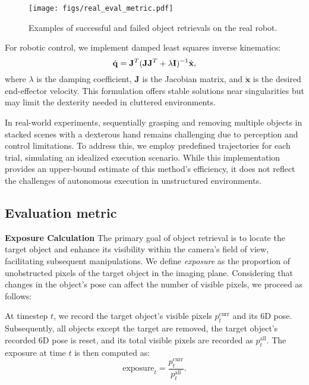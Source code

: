 \begin{figure*}[!t]
    \centering
    \texttt{[image: figs/real\_eval\_metric.pdf]}
    \caption{{Examples of successful and failed object retrievals on the real robot.}}
    \label{fig:real_eval_metric}
\end{figure*}

For robotic control, we implement damped least squares inverse kinematics: 
\begin{equation} 
    \dot{\mathbf{q}} = \mathbf{J}^T(\mathbf{J}\mathbf{J}^T + \lambda \mathbf{I})^{-1}\dot{\mathbf{x}}, \notag 
\end{equation} 
where $\lambda$ is the damping coefficient, $\mathbf{J}$ is the Jacobian matrix, and $\dot{\mathbf{x}}$ is the desired end-effector velocity. This formulation offers stable solutions near singularities but may limit the dexterity needed in cluttered environments.


In real-world experiments, sequentially grasping and removing multiple objects in stacked scenes with a dexterous hand remains challenging due to perception and control limitations. To address this, we employ predefined trajectories for each trial, simulating an idealized execution scenario. While this implementation provides an upper-bound estimate of this method’s efficiency, it does not reflect the challenges of autonomous execution in unstructured environments.

\subsection{Evaluation metric}\label{appendix:eval_metric}
\noindent \textbf{Exposure Calculation}
The primary goal of object retrieval is to locate the target object and enhance its visibility within the camera’s field of view, facilitating subsequent manipulations. We define \textit{exposure} as the proportion of unobstructed pixels of the target object in the imaging plane. Considering that changes in the object's pose can affect the number of visible pixels, we proceed as follows:

At timestep $t$, we record the target object's visible pixels $p_t^\textrm{curr}$ and its 6D pose. Subsequently, all objects except the target are removed, the target object's recorded 6D pose is reset, and its total visible pixels are recorded as $p_t^\textrm{all}$. The exposure at time $t$ is then computed as:
\begin{equation}
    \textrm{exposure}_t = \frac{p_t^\textrm{curr}}{p_t^\textrm{all}}.
\end{equation}



